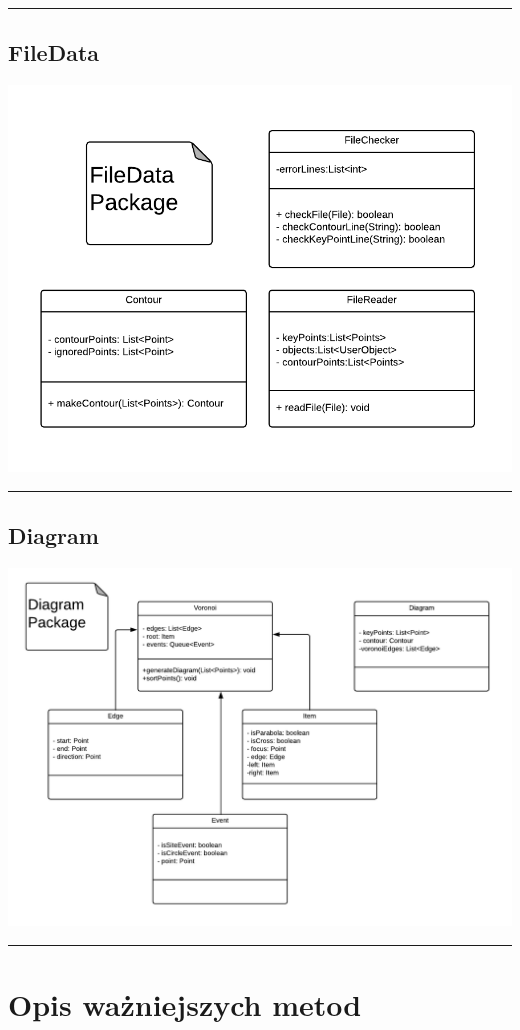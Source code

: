 \documentclass[a4paper,11pt]{article}
\newcommand{\linia}{\rule{\linewidth}{0.4mm}}
\begin{document}
\noindent\linia
\subsection{FileData}
\includegraphics[scale=1]{fileDataPackage.png} 

\noindent\linia
\subsection{Diagram}
\includegraphics[scale=0.9]{diagramPackage.png} 

\noindent\linia
\section{Opis ważniejszych metod}
\end{document}
